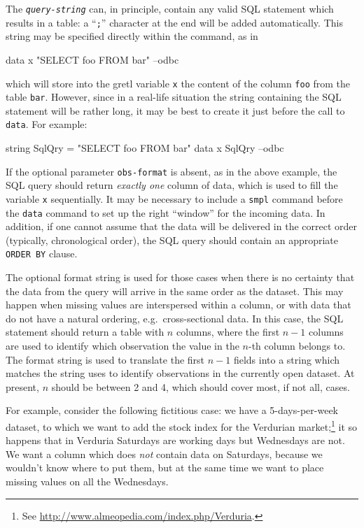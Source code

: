 The \texttt{\emph{query-string}} can, in principle, contain any valid
SQL statement which results in a table: a ``\texttt{;}'' character at
the end will be added automatically. This string may be specified
directly within the command, as in
\begin{code}
  data x "SELECT foo FROM bar" --odbc
\end{code}
which will store into the gretl variable \texttt{x} the content of the
column \texttt{foo} from the table \texttt{bar}. However, since in a
real-life situation the string containing the SQL statement will be
rather long, it may be best to create it just before the call to
\texttt{data}. For example:
\begin{code}
  string SqlQry = "SELECT foo FROM bar"
  data x SqlQry --odbc
\end{code}

If the optional parameter \texttt{obs-format} is absent, as in the
above example, the SQL query should return \emph{exactly one} column
of data, which is used to fill the variable \texttt{x}
sequentially.  It may be necessary to include a \texttt{smpl} command
before the \texttt{data} command to set up the right ``window'' for
the incoming data.  In addition, if one cannot assume that the data
will be delivered in the correct order (typically, chronological
order), the SQL query should contain an appropriate \texttt{ORDER BY}
clause.

The optional format string is used for those cases when there is no
certainty that the data from the query will arrive in the same order
as the  dataset. This may happen when missing values are
interspersed within a column, or with data that do not have a natural
ordering, e.g.\ cross-sectional data. In this case, the SQL statement
should return a table with $n$ columns, where the first $n-1$ columns
are used to identify which observation the value in the $n$-th column
belongs to. The format string is used to translate the first $n-1$
fields into a string which matches the string  uses to
identify observations in the currently open dataset. At present, $n$
should be between 2 and 4, which should cover most, if not all, cases.

For example, consider the following fictitious case: we have a
5-days-per-week dataset, to which we want to add the stock index for
the Verdurian market;\footnote{See
  \url{http://www.almeopedia.com/index.php/Verduria}.} it so
happens that in Verduria Saturdays are working days but Wednesdays are
not. We want a column which does \emph{not} contain data on
Saturdays, because we wouldn't know where to put them, but at the same
time we want to place missing values on all the Wednesdays.

